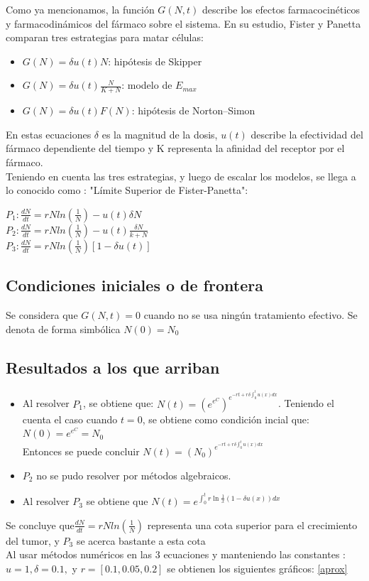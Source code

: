 \documentclass[a4 paper, 12pt]{article}
\begin{document}
Como ya mencionamos, la funci\'on $G(N, t)$ describe los efectos farmacocin\'eticos y farmacodin\'amicos del f\'armaco sobre el sistema. En su estudio, Fister y Panetta comparan tres estrategias para matar c\'elulas:  

\begin{itemize}
\item $G(N) = \delta u(t)N$: hip\'otesis de Skipper
\item $G(N) = \delta u(t)\frac{N}{K+N}$:  modelo de $E_{max}$  
\item $G(N) = \delta u(t)F(N)$: hip\'otesis de Norton–Simon
\end{itemize}


En estas ecuaciones $\delta$ es la magnitud de la dosis,  $u(t)$ describe la efectividad del f\'armaco dependiente del tiempo y K representa la afinidad del receptor por el fármaco. \\
Teniendo en cuenta las tres estrategias, y luego de escalar los modelos, se llega a lo conocido como : "L\'imite Superior de Fister-Panetta":

\begin{center}
$ P_{1} :  \frac{dN}{dt} = rNln(\frac{1}{N}) - u(t)\delta N$ \\[10pt]
$ P_{2}:  \frac{dN}{dt} = rNln(\frac{1}{N}) - u(t) \frac{\delta N}{k + N}$ \\[10pt]
$ P_{3}:  \frac{dN}{dt} = rNln(\frac{1}{N}) [1 - \delta u(t)]$

\end{center}

\subsection{Condiciones iniciales o de frontera}
Se considera que $G(N,t) = 0$ cuando no se usa ning\'un tratamiento efectivo. Se denota de forma simb\'olica $N(0) = N_{0}$ \\

\subsection{Resultados a los que arriban}
\begin{itemize}
\item Al resolver $P_{1}$, se obtiene que: $N(t) = (e^{e^C})^{e^{-rt+r\delta \int_0^t u(x)dx }}$. Teniendo el cuenta el caso cuando $t=0$, se obtiene como condici\'on incial que: $N(0) = e^{e^C} = N_{0}$ \\
Entonces se puede concluir $N(t) = (N_0)^{e^{-rt+r\delta \int_0^t u(x)dx }}$ 
\item $P_2$ no se pudo resolver por m\'etodos algebraicos.
\item Al resolver $P_{3}$ se obtiene que $N(t) = e^{\int_0^t{r \ln \frac{1}{x}(1-\delta u(x))dx}}$
\end{itemize}
Se concluye que$ \frac{dN}{dt} = rNln(\frac{1}{N}) $ representa una cota superior para el crecimiento del tumor, y $ P_{3}$ se acerca bastante a esta cota \\[10pt]
Al usar m\'etodos num\'ericos en las 3 ecuaciones y manteniendo las constantes : $u = 1, \delta = 0.1 ,$ y $r= [0.1, 0.05, 0.2]$ se obtienen los siguientes gr\'aficos: \ref{aprox}
\end{document}
